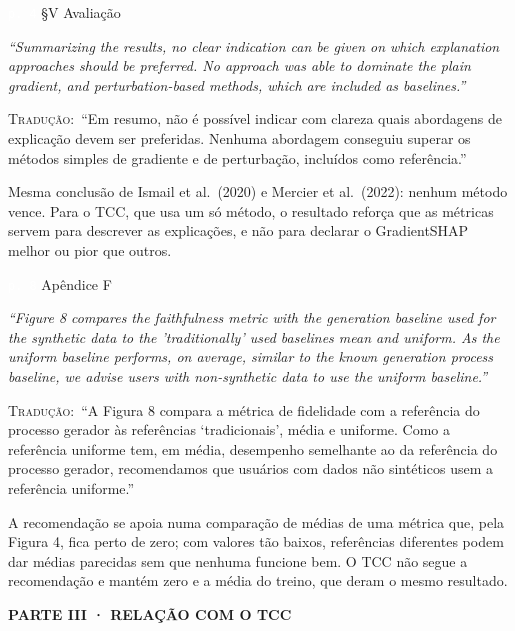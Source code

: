 \documentclass[11pt,a4paper]{article}
\newcommand{\pagechip}[1]{{\setlength{\fboxsep}{1.5pt}\colorbox{cAcc}{\textcolor{white}{\scriptsize\texttt{#1}}}}}
\newcommand{\partbar}[1]{\par\vspace{1.2em}\noindent\colorbox{black!80}{\parbox{\dimexpr\linewidth-2\fboxsep}{\color{white}\bfseries\sffamily\MakeUppercase{#1}}}\par\vspace{0.4em}}
\newenvironment{origquote}{\par\itshape\small}{\par}
\newenvironment{tradquote}{\par\small\textsc{Tradução:}\ }{\par}
\newcommand{\explab}[1]{\par\smallskip{\small\color{cAcc}\textbf{\MakeUppercase{#1}}}\par}
\begin{document}
\begin{citacard}{\pagechip{p. 4} §V Avaliação}
\begin{origquote}“Summarizing the results, no clear indication can be given on which explanation approaches should be preferred. No approach was able to dominate the plain gradient, and perturbation-based methods, which are included as baselines.”\end{origquote}
\begin{tradquote}“Em resumo, não é possível indicar com clareza quais abordagens de explicação devem ser preferidas. Nenhuma abordagem conseguiu superar os métodos simples de gradiente e de perturbação, incluídos como referência.”\end{tradquote}
\explab{Explicação}
Mesma conclusão de Ismail et al.\ (2020) e Mercier et al.\ (2022): nenhum método vence. Para o TCC, que usa um só método, o resultado reforça que as métricas servem para descrever as explicações, e não para declarar o GradientSHAP melhor ou pior que outros.
\end{citacard}

\begin{citacard}{\pagechip{p. 8} Apêndice F}
\begin{origquote}“Figure 8 compares the faithfulness metric with the generation baseline used for the synthetic data to the ’traditionally’ used baselines mean and uniform. As the uniform baseline performs, on average, similar to the known generation process baseline, we advise users with non-synthetic data to use the uniform baseline.”\end{origquote}
\begin{tradquote}“A Figura 8 compara a métrica de fidelidade com a referência do processo gerador às referências ‘tradicionais’, média e uniforme. Como a referência uniforme tem, em média, desempenho semelhante ao da referência do processo gerador, recomendamos que usuários com dados não sintéticos usem a referência uniforme.”\end{tradquote}
\explab{Explicação}
A recomendação se apoia numa comparação de médias de uma métrica que, pela Figura 4, fica perto de zero; com valores tão baixos, referências diferentes podem dar médias parecidas sem que nenhuma funcione bem. O TCC não segue a recomendação e mantém zero e a média do treino, que deram o mesmo resultado.
\end{citacard}

\partbar{Parte III · Relação com o TCC}
\end{document}
